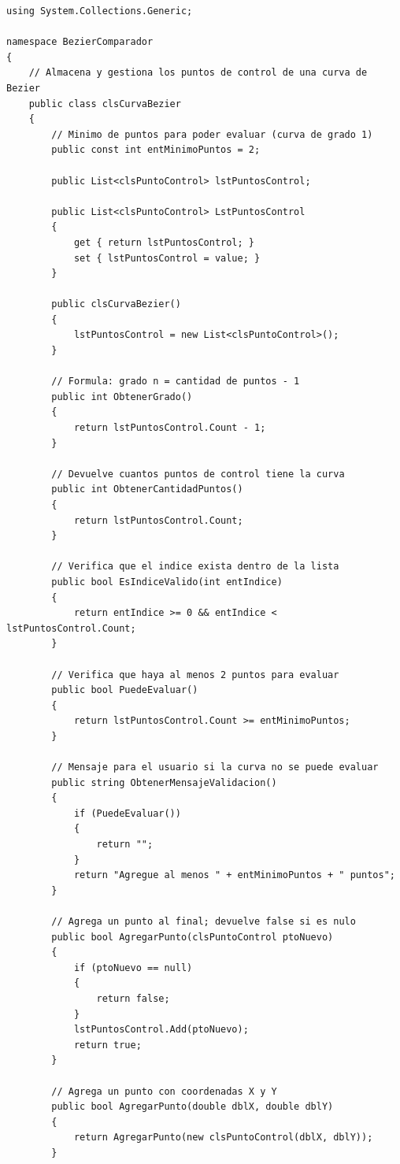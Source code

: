 \begin{lstlisting}[language={[Sharp]C}, caption={Clase clsCurvaBezier (gestion de puntos de control y validaciones).}, label={lst:anx_curva}]
using System.Collections.Generic;

namespace BezierComparador
{
    // Almacena y gestiona los puntos de control de una curva de Bezier
    public class clsCurvaBezier
    {
        // Minimo de puntos para poder evaluar (curva de grado 1)
        public const int entMinimoPuntos = 2;

        public List<clsPuntoControl> lstPuntosControl;

        public List<clsPuntoControl> LstPuntosControl
        {
            get { return lstPuntosControl; }
            set { lstPuntosControl = value; }
        }

        public clsCurvaBezier()
        {
            lstPuntosControl = new List<clsPuntoControl>();
        }

        // Formula: grado n = cantidad de puntos - 1
        public int ObtenerGrado()
        {
            return lstPuntosControl.Count - 1;
        }

        // Devuelve cuantos puntos de control tiene la curva
        public int ObtenerCantidadPuntos()
        {
            return lstPuntosControl.Count;
        }

        // Verifica que el indice exista dentro de la lista
        public bool EsIndiceValido(int entIndice)
        {
            return entIndice >= 0 && entIndice < lstPuntosControl.Count;
        }

        // Verifica que haya al menos 2 puntos para evaluar
        public bool PuedeEvaluar()
        {
            return lstPuntosControl.Count >= entMinimoPuntos;
        }

        // Mensaje para el usuario si la curva no se puede evaluar
        public string ObtenerMensajeValidacion()
        {
            if (PuedeEvaluar())
            {
                return "";
            }
            return "Agregue al menos " + entMinimoPuntos + " puntos";
        }

        // Agrega un punto al final; devuelve false si es nulo
        public bool AgregarPunto(clsPuntoControl ptoNuevo)
        {
            if (ptoNuevo == null)
            {
                return false;
            }
            lstPuntosControl.Add(ptoNuevo);
            return true;
        }

        // Agrega un punto con coordenadas X y Y
        public bool AgregarPunto(double dblX, double dblY)
        {
            return AgregarPunto(new clsPuntoControl(dblX, dblY));
        }


\end{lstlisting}
